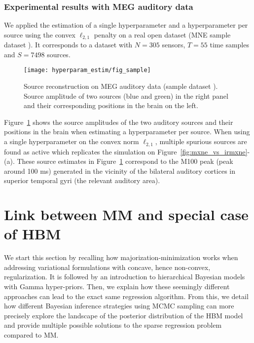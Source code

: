 \subsubsection{Experimental results with MEG auditory data}

We applied the estimation of a single hyperparameter and a hyperparameter per source using the convex $\ell_{2,1}$ penalty on a real open dataset (MNE sample dataset \cite{mne}). It corresponds to a dataset with $N=305$ sensors, $T=55$ time samples and $S=7498$ sources. 
\begin{figure}
\texttt{[image: hyperparam\_estim/fig\_sample]}
    \caption{Source reconstruction on MEG auditory data (sample dataset \cite{mne}). Source amplitude of two sources (blue and green) in the right panel and their corresponding positions in the brain on the left. 
    }
    \label{fig:sample_data}
\end{figure}
Figure~\ref{fig:sample_data} shows the source amplitudes of the two auditory sources and their positions in the brain when estimating a hyperparameter per source. When using a single hyperparameter on the convex norm $\ell_{2,1}$, multiple spurious sources are found as active which replicates the simulation on Figure~\ref{fig:mxne_vs_irmxne}-(a). These source estimates in Figure~\ref{fig:sample_data} correspond to the M100 peak (peak around 100 ms) generated in the vicinity of the bilateral auditory cortices in superior temporal gyri (the relevant auditory area).


\section{Link between MM and special case of HBM}\label{link_hbm_mm}

We start this section by recalling how majorization-minimization works
when addressing variational formulations with concave, hence non-convex, regularization. It is followed by an introduction to hierarchical Bayesian models with Gamma hyper-priors. Then, we explain how these seemingly different approaches can lead to the exact same regression algorithm.
From this, we detail how different Bayesian inference strategies using MCMC
sampling can more precisely explore the landscape of the posterior distribution of the HBM model and provide multiple possible solutions to the sparse regression problem compared to MM.

